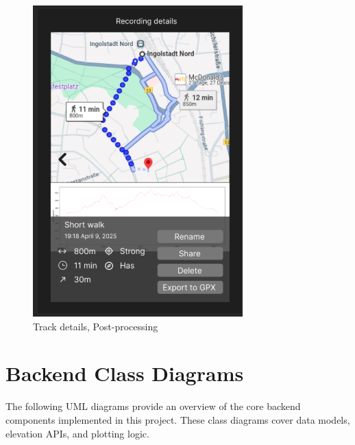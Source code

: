 \documentclass[12pt]{article}
\begin{document}
\begin{figure}[h!]
    \centering
    \includegraphics[width=\textwidth]{Project_Screenshots/recordingdata.png}
    \caption{Track details, Post-processing}
\end{figure}

\clearpage
\section{Backend Class Diagrams}

The following UML diagrams provide an overview of the core backend components implemented in this project. These class diagrams cover data models, elevation APIs, and plotting logic.
\end{document}
